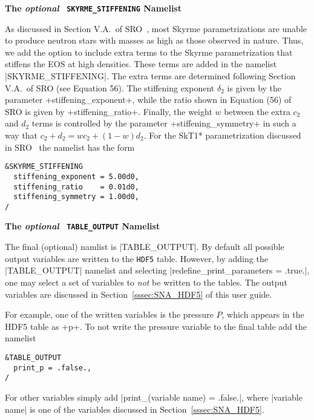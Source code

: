 \documentclass[letterpaper,11pt]{refart}
\begin{document}
\bigskip
\textbf{The \emph{optional} \texttt{\color{cyan} SKYRME\_STIFFENING}
  Namelist}

As discussed in Section V.A.\ of SRO~\cite{schneider:17}, most Skyrme
parametrizations are unable to produce neutron stars with masses as
high as those observed in nature.  Thus, we add the option to include
extra terms to the Skyrme parametrization that stiffens the EOS at
high densities. These terms are added in the namelist
\verbnml|SKYRME_STIFFENING|.  The extra terms are determined following
Section V.A.\ of SRO \cite{schneider:17} (see Equation 56).  The
stiffening exponent $\delta_2$ is given by the parameter
\verbprm+stiffening_exponent+, while the ratio shown in Equation (56)
of SRO \cite{schneider:17} is given by
\verbprm+stiffening_ratio+. Finally, the weight $w$ between the extra $c_2$ and $d_2$ terms is controlled by the parameter
\verbprm+stiffening_symmetry+ in such a way that $c_2+d_2=wc_2+(1-w)d_2$.  For the SkT1* parametrization
discussed in SRO~\cite{schneider:17} the namelist has the form {\color{cyan}
\begin{verbatim}
&SKYRME_STIFFENING
  stiffening_exponent = 5.00d0,
  stiffening_ratio    = 0.01d0,
  stiffening_symmetry = 1.00d0,
/
\end{verbatim}}



\vspace*{1cm}

\textbf{The \emph{optional} \texttt{\color{cyan} TABLE\_OUTPUT}
  Namelist}


The final (optional) namlist is \verbnml|TABLE_OUTPUT|.  
By default all possible output variables are written
to the \verb|HDF5| table.  However, by adding the \verbnml|TABLE_OUTPUT| 
namelist and selecting \verbprm|redefine_print_parameters = .true.|,
one may select a set of variables to \emph{not} be written to the
tables.  The output variables are discussed in
Section~\ref{sssec:SNA_HDF5} of this user guide.

For example, one of the written variables is the pressure $P$, which
appears in the HDF5 table as \verbprm+p+.  To not write the pressure
variable to the final table add the namelist {\color{cyan}
\begin{verbatim}
&TABLE_OUTPUT
  print_p = .false.,
/
\end{verbatim}}
For other variables simply add \verbprm|print_(variable name) = .false.|, where
\verbprm|variable name| is one of the variables discussed in 
Section~\ref{sssec:SNA_HDF5}.
\end{document}
